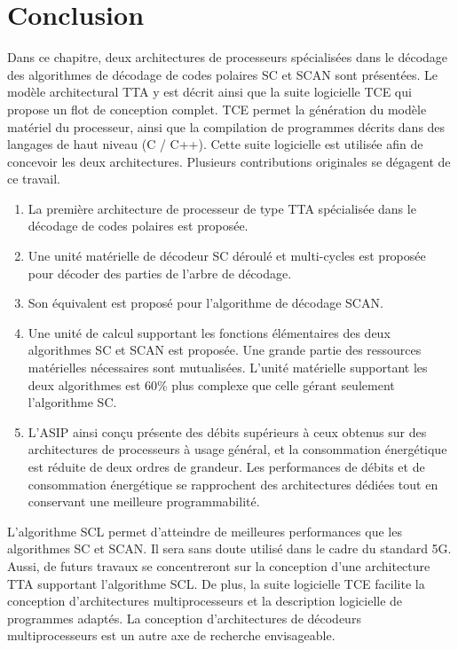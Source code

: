 \section*{Conclusion}


Dans ce chapitre, deux architectures de processeurs spécialisées dans le décodage des algorithmes de décodage de codes polaires SC et SCAN sont présentées. Le modèle architectural TTA y est décrit ainsi que la suite logicielle TCE qui propose un flot de conception complet. TCE permet la génération du modèle matériel du processeur, ainsi que la compilation de programmes décrits dans des langages de haut niveau (C / C++). Cette suite logicielle est utilisée afin de concevoir les deux architectures. Plusieurs contributions originales se dégagent de ce travail.

\begin{enumerate}[label=(\roman*)]
  \item La première architecture de processeur de type TTA spécialisée dans le décodage de codes polaires est proposée.
  \item Une unité matérielle de décodeur SC déroulé et multi-cycles est proposée pour décoder des parties de l'arbre de décodage.
  \item Son équivalent est proposé pour l'algorithme de décodage SCAN.
  \item Une unité de calcul supportant les fonctions élémentaires des deux algorithmes SC et SCAN est proposée. Une grande partie des ressources matérielles nécessaires sont mutualisées. L'unité matérielle supportant les deux algorithmes est 60\% plus complexe que celle gérant seulement l'algorithme SC.
  \item L'ASIP ainsi conçu présente des débits supérieurs à ceux obtenus sur des architectures de processeurs à usage général, et la consommation énergétique est réduite de deux ordres de grandeur. Les performances de débits et de consommation énergétique se rapprochent des architectures dédiées tout en conservant une meilleure programmabilité.
\end{enumerate}

L'algorithme SCL permet d'atteindre de meilleures performances que les algorithmes SC et SCAN. Il sera sans doute utilisé dans le cadre du standard 5G. Aussi, de futurs travaux se concentreront sur la conception d'une architecture TTA supportant l'algorithme SCL. De plus, la suite logicielle TCE facilite la conception d'architectures multiprocesseurs et la description logicielle de programmes adaptés. La conception d'architectures de décodeurs multiprocesseurs est un autre axe de recherche envisageable.


